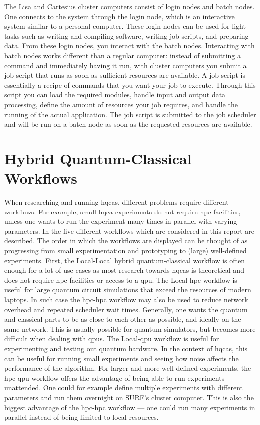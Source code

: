 The Lisa and Cartesius cluster computers consist of login nodes and batch nodes.
One connects to the system through the login node, which is an interactive system similar to a personal computer.
These login nodes can be used for light tasks such as writing and compiling software, writing job scripts, and preparing data.
From these login nodes, you interact with the batch nodes.
Interacting with batch nodes works different than a regular computer: instead of submitting a command and immediately having it run, with cluster computers you submit a job script that runs as soon as sufficient resources are available.
A job script is essentially a recipe of commands that you want your job to execute.
Through this script you can load the required modules, handle input and output data processing, define the amount of resources your job requires, and handle the running of the actual application.
The job script is submitted to the job scheduler and will be run on a batch node as soon as the requested resources are available.

\section{Hybrid Quantum-Classical Workflows} \label{sec:workflows}
When researching and running \glspl{hqca}, different problems require different workflows.
For example, small \gls{hqca} experiments do not require \gls{hpc} facilities, unless one wants to run the experiment many times in parallel with varying parameters.
In  the five different workflows which are considered in this report are described.
The order in which the workflows are displayed can be thought of as progressing from small experimentation and prototyping to (large) well-defined experiments.
First, the Local-Local hybrid quantum-classical workflow is often enough for a lot of use cases as most research towards \glspl{hqca} is theoretical and does not require \gls{hpc} facilities or access to a \gls{qpu}.
The Local-\gls{hpc} workflow is useful for large quantum circuit simulations that exceed the resources of modern laptops.
In such case the \gls{hpc}-\gls{hpc} workflow may also be used to reduce network overhead and repeated scheduler wait times.
Generally, one wants the quantum and classical parts to be as close to each other as possible, and ideally on the same network.
This is usually possible for quantum simulators, but becomes more difficult when dealing with \glspl{qpu}.
The Local-\gls{qpu} workflow is useful for experimenting and testing out quantum hardware.
In the context of \glspl{hqca}, this can be useful for running small experiments and seeing how noise affects the performance of the algorithm.
For larger and more well-defined experiments, the \gls{hpc}-\gls{qpu} workflow offers the advantage of being able to run experiments unattended.
One could for example define multiple experiments with different parameters and run them overnight on SURF's cluster computer.
This is also the biggest advantage of the \gls{hpc}-\gls{hpc} workflow --- one could run many experiments in parallel instead of being limited to local resources.

